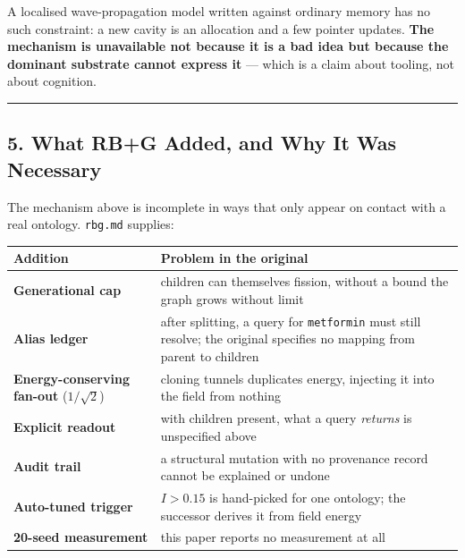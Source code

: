 \documentclass[
  11pt,
  a4paper,
]{article}
\begin{document}
A localised wave-propagation model written against ordinary memory has
no such constraint: a new cavity is an allocation and a few pointer
updates. \textbf{The mechanism is unavailable not because it is a bad
idea but because the dominant substrate cannot express it} --- which is
a claim about tooling, not about cognition.

\begin{center}\rule{0.5\linewidth}{0.5pt}\end{center}

\subsection{5. What RB+G Added, and Why It Was
Necessary}\label{what-rbg-added-and-why-it-was-necessary}

The mechanism above is incomplete in ways that only appear on contact
with a real ontology. \texttt{rbg.md} supplies:

\begin{longtable}[]{@{}
  >{\raggedright\arraybackslash}p{}
  >{\raggedright\arraybackslash}p{}@{}}
\toprule\noalign{}
\begin{minipage}[b]{\linewidth}\raggedright
Addition
\end{minipage} & \begin{minipage}[b]{\linewidth}\raggedright
Problem in the original
\end{minipage} \\
\midrule\noalign{}
\endhead
\bottomrule\noalign{}
\endlastfoot
\textbf{Generational cap} & children can themselves fission, without a
bound the graph grows without limit \\
\textbf{Alias ledger} & after splitting, a query for \texttt{metformin}
must still resolve; the original specifies no mapping from parent to
children \\
\textbf{Energy-conserving fan-out} (\(1/\sqrt{2}\)) & cloning tunnels
duplicates energy, injecting it into the field from nothing \\
\textbf{Explicit readout} & with children present, what a query
\emph{returns} is unspecified above \\
\textbf{Audit trail} & a structural mutation with no provenance record
cannot be explained or undone \\
\textbf{Auto-tuned trigger} & \(I > 0.15\) is hand-picked for one
ontology; the successor derives it from field energy \\
\textbf{20-seed measurement} & this paper reports no measurement at
all \\
\end{longtable}
\end{document}
